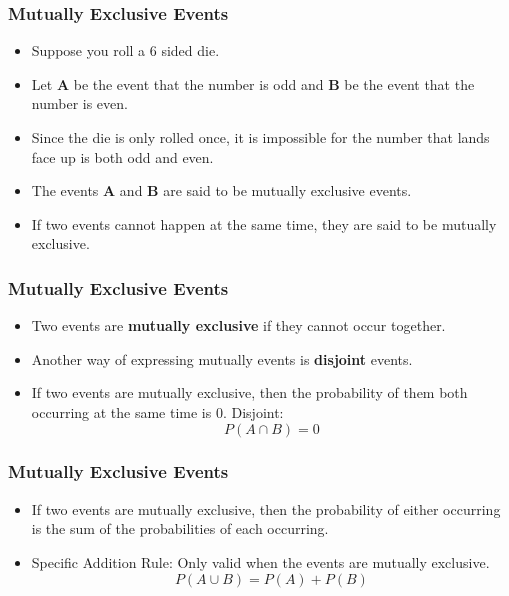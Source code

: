 \documentclass[IntroMain.tex]{subfiles}
\begin{document}
\begin{frame}
\frametitle{Mutually Exclusive Events}
\Large
\begin{itemize}
\item Suppose you roll a 6 sided die. \item Let \textbf{A} be the event that the number is odd and \textbf{B} be the event that the number is even. 
\item Since the die is only rolled once, it is impossible for the number that lands face up is both odd and even. \item The events \textbf{A} and \textbf{B} are said to be mutually exclusive events. \item If two events cannot happen at the same time, they are said to be mutually exclusive.


\end{itemize}
\end{frame}
\begin{frame}
\frametitle{Mutually Exclusive Events}
\Large
\begin{itemize}
\item Two events are \textbf{mutually exclusive} if they cannot occur together. 
\item Another way of expressing mutually events is \textbf{disjoint} events.
\item If two events are mutually exclusive, then the probability of them both occurring at the same time is 0.
   Disjoint:  \[P(A \cap B) = 0\]
\end{itemize}
\end{frame}
\begin{frame}
\frametitle{Mutually Exclusive Events}
\Large
\begin{itemize}
\item If two events are mutually exclusive, then the probability of either occurring is the sum of the probabilities of each occurring.
\item Specific Addition Rule: Only valid when the events are mutually exclusive.
 \[P(A \cup B) = P(A) + P(B)\]
\end{itemize}   
\end{frame}
\end{document}
